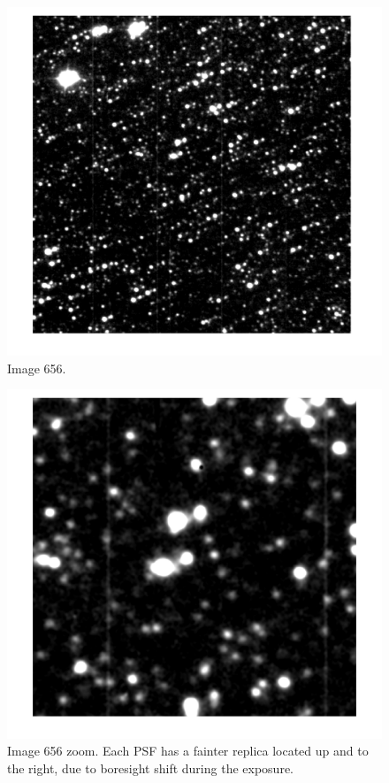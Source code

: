 \documentclass[SE,authoryear,toc]{lsstdoc}
\begin{document}
\begin{figure}
    \centering
    \includegraphics[width=6in]{Image656png.png}
    \caption{Image 656.}
    \label{fig:image}
\end{figure}

\begin{figure}
    \centering
    \includegraphics[width=6in]{Image656zoom.png}
    \caption{Image 656 zoom. Each PSF has a fainter replica located up and to the right, due to boresight shift during the exposure.}
    \label{fig:imagezoom}
\end{figure}
\end{document}
